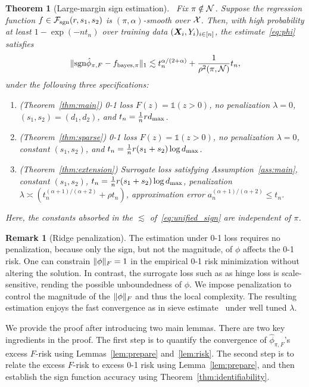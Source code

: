 \documentclass[11pt]{article}
\theoremstyle{plain}
\newtheorem{thm}{Theorem}[subsection]
\theoremstyle{definition}
\newtheorem{rmk}{Remark}
\def\caliF{\tF_{\textup{sgn}}}
\def\sign{\textup{sgn}}
\def\bayespif{f_{\textup{bayes},\pi}}
\def\caliF{\tF_{\textup{sgn}}}
\begin{document}
 \begin{thm}[Large-margin sign estimation]~\label{thm:unified} Fix $\pi\notin\mathcal{N}$. Suppose the regression function $f\in\caliF(r,s_1,s_2)$ is $(\pi,\alpha)$-smooth over $\mathcal{X}$. Then, with high probability at least $1-\exp(-nt_n)$ over training data $(\bm X_i,Y_i)_{i\in[n]}$, the estimate~\eqref{eq:phi} satisfies
\begin{equation}\label{eq:unified_sign}
\onenormSize{}{\sign \hat \phi_{\pi,F}-\bayespif}\lesssim t_n^{\alpha/( 2+\alpha)}+{1\over \rho^2(\pi,\tN)}t_n,
\end{equation}
under the following three specifications:
\begin{enumerate}[wide, labelwidth=!, labelindent=0pt]
\item[(a)] (Theorem~\ref{thm:main}) 0-1 loss $F(z)=\mathds{1}(z>0)$, no penalization $\lambda=0$, $(s_1,s_2)=(d_1,d_2)$, and $t_n={1\over n}rd_{\max} $.
\item[(b)] (Theorem~\ref{thm:sparse}) 0-1 loss $F(z)=\mathds{1}(z>0)$, no penalization $\lambda=0$, constant $(s_1,s_2)$,  and $t_n={1\over n}r(s_1+s_2) \log d_{\max}$. 
\item[(c)] (Theorem~\ref{thm:extension}) Surrogate loss satisfying Assumption~\ref{ass:main}, constant $(s_1,s_2)$, $t_n={1\over n} r(s_1+s_2) \log d_{\max}$, penalization $\lambda\asymp (t^{(\alpha+1)/(\alpha+2)}_n+\rho t_n )$, approximation error $a^{(\alpha+1)/(\alpha+2)}_n \leq t_n$.
\end{enumerate}
Here, the constants absorbed in the $\lesssim$ of~\eqref{eq:unified_sign} are independent of $\pi$. 
\end{thm}
\begin{rmk}[Ridge penalization]
The estimation under 0-1 loss requires no penalization, because only the sign, but not the magnitude, of $\phi$ affects the 0-1 risk. One can constrain $\lVert\phi\rVert_F=1$ in the empirical 0-1 risk minimization without altering the solution. In contrast, the surrogate loss such as as hinge loss is scale-sensitive, rending the possible unboundedness of $\phi$. We impose penalization to control the magnitude of the $\lVert\phi\rVert_F$ and thus the local complexity. The resulting estimation enjoys the fast convergence as in sieve estimate~\citep{shen1994convergence} under well tuned $\lambda$.   
\end{rmk}


We provide the proof after introducing two main lemmas.
There are two key ingredients in the proof. The first step is to quantify the convergence of $\hat \phi_{\pi,F}$'s excess $F$-risk using Lemmas~\ref{lem:prepare} and~\ref{lem:risk}. The second step is to relate the excess $F$-risk to excess 0-1 risk using Lemma~\ref{lem:prepare}, and then establish the sign function accuracy using Theorem~\ref{thm:identifiability}.
\end{document}
